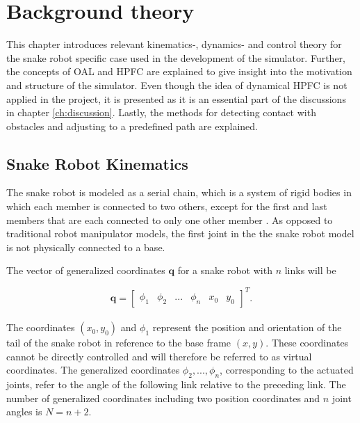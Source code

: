 \chapter{Background theory}\label{chapter:theory}

This chapter introduces relevant kinematics-, dynamics- and control theory for the snake robot specific case used in the development of the simulator. Further, the concepts of OAL and HPFC are explained to give insight into the motivation and structure of the simulator. Even though the idea of dynamical HPFC \cite{yoshikawa1987dynamic} is not applied in the project, it is presented as it is an essential part of the discussions in chapter \ref{ch:discussion}. Lastly, the methods for detecting contact with obstacles and adjusting to a predefined path are explained.


\section{Snake Robot Kinematics} \label{sec:kin}


The snake robot is modeled as a serial chain, which is a system of rigid bodies in which each member is connected to two others, except for the first and last members that are each connected to only one other member \cite{waldron2016kinematics}. As opposed to traditional robot manipulator models, the first joint in the the snake robot model is not physically connected to a base.


The vector of generalized coordinates $\mathbf{q}$ for a snake robot with $n$ links will be

\begin{equation} \label{eq:q}
    \mathbf{q} = 
    \begin{bmatrix}
        \phi_1 & \phi_2 & ... & \phi_n & x_0 & y_0
    \end{bmatrix}^T.
\end{equation}
\\
The coordinates $(x_0, y_0)$ and $\phi_1$ represent the position and orientation of the tail of the snake robot in reference to the base frame $(x,y)$. These coordinates cannot be directly controlled and will therefore be referred to as virtual coordinates. The generalized coordinates ${\phi_2, ... ,  \phi_n}$, corresponding to the actuated joints, refer to the angle of the following link relative to the preceding link. The number of generalized coordinates including two position coordinates and $n$ joint angles is $N = n+2$.

